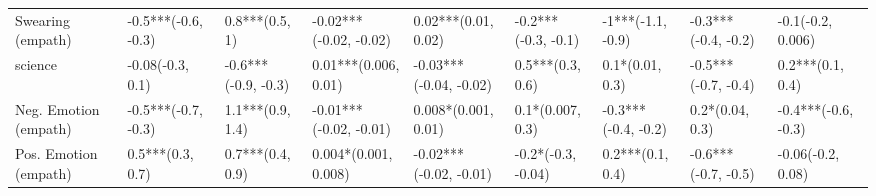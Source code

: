 \begin{table}[h]
\begin{adjustbox}{width=\linewidth, center}
\begin{tabular}{lllllllll}
	Swearing (empath)     &  -0.5***(-0.6, -0.3) &       0.8***(0.5, 1) &    -0.02***(-0.02, -0.02) &     0.02***(0.01, 0.02) &  -0.2***(-0.3, -0.1) &    -1***(-1.1, -0.9) &  -0.3***(-0.4, -0.2) &    -0.1(-0.2, 0.006) \\
	science               &     -0.08(-0.3, 0.1) &  -0.6***(-0.9, -0.3) &      0.01***(0.006, 0.01) &  -0.03***(-0.04, -0.02) &     0.5***(0.3, 0.6) &      0.1*(0.01, 0.3) &  -0.5***(-0.7, -0.4) &     0.2***(0.1, 0.4) \\
	Neg. Emotion (empath) &  -0.5***(-0.7, -0.3) &     1.1***(0.9, 1.4) &    -0.01***(-0.02, -0.01) &     0.008*(0.001, 0.01) &     0.1*(0.007, 0.3) &  -0.3***(-0.4, -0.2) &      0.2*(0.04, 0.3) &  -0.4***(-0.6, -0.3) \\
	Pos. Emotion (empath) &     0.5***(0.3, 0.7) &     0.7***(0.4, 0.9) &      0.004*(0.001, 0.008) &  -0.02***(-0.02, -0.01) &   -0.2*(-0.3, -0.04) &     0.2***(0.1, 0.4) &  -0.6***(-0.7, -0.5) &    -0.06(-0.2, 0.08) \\
	\bottomrule
	\end{tabular}
	
\end{adjustbox}
	\end{table}

